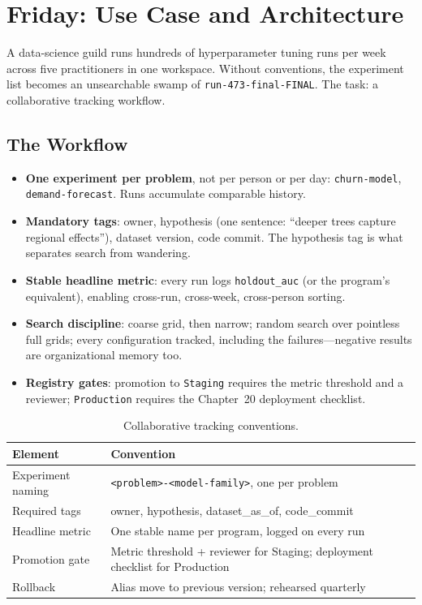\section{Friday: Use Case and Architecture}
A data-science guild runs hundreds of hyperparameter tuning runs per week across five practitioners in one workspace. Without conventions, the experiment list becomes an unsearchable swamp of \texttt{run-473-final-FINAL}. The task: a collaborative tracking workflow.

\subsection{The Workflow}
\begin{itemize}
    \item \textbf{One experiment per problem}, not per person or per day: \texttt{churn-model}, \texttt{demand-forecast}. Runs accumulate comparable history.
    \item \textbf{Mandatory tags}: owner, hypothesis (one sentence: ``deeper trees capture regional effects''), dataset version, code commit. The hypothesis tag is what separates search from wandering.
    \item \textbf{Stable headline metric}: every run logs \texttt{holdout\_auc} (or the program's equivalent), enabling cross-run, cross-week, cross-person sorting.
    \item \textbf{Search discipline}: coarse grid, then narrow; random search over pointless full grids; every configuration tracked, including the failures---negative results are organizational memory too.
    \item \textbf{Registry gates}: promotion to \texttt{Staging} requires the metric threshold and a reviewer; \texttt{Production} requires the Chapter~20 deployment checklist.
\end{itemize}

\begin{table}[H]
\centering
\small
\begin{tabular}{@{}p{4.2cm}p{9.6cm}@{}}
\toprule
\textbf{Element} & \textbf{Convention} \\
\midrule
Experiment naming & \texttt{<problem>-<model-family>}, one per problem \\
Required tags & owner, hypothesis, dataset\_as\_of, code\_commit \\
Headline metric & One stable name per program, logged on every run \\
Promotion gate & Metric threshold + reviewer for Staging; deployment checklist for Production \\
Rollback & Alias move to previous version; rehearsed quarterly \\
\bottomrule
\end{tabular}
\caption{Collaborative tracking conventions.}
\label{tab:chapter18-conventions}
\end{table}

